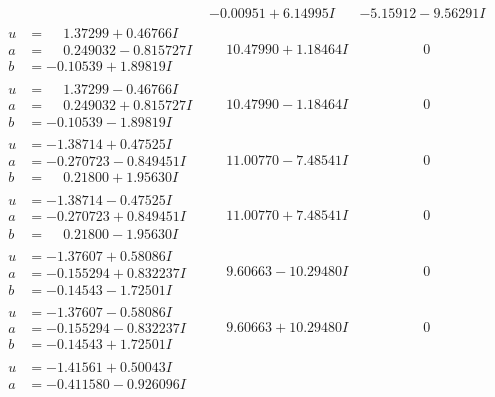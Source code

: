\documentclass[1p]{elsarticle_modified}
\theoremstyle{definition}
\begin{document}
$$\begin{array}{c|c|c}
 & -0.00951 + 6.14995 I & -5.15912 - 9.56291 I \\ \hline\begin{aligned}
u &= \phantom{-}1.37299 + 0.46766 I \\
a &= \phantom{-}0.249032 - 0.815727 I \\
b &= -0.10539 + 1.89819 I\end{aligned}
 & \phantom{-}10.47990 + 1.18464 I & \phantom{-0.000000 } 0 \\ \hline\begin{aligned}
u &= \phantom{-}1.37299 - 0.46766 I \\
a &= \phantom{-}0.249032 + 0.815727 I \\
b &= -0.10539 - 1.89819 I\end{aligned}
 & \phantom{-}10.47990 - 1.18464 I & \phantom{-0.000000 } 0 \\ \hline\begin{aligned}
u &= -1.38714 + 0.47525 I \\
a &= -0.270723 - 0.849451 I \\
b &= \phantom{-}0.21800 + 1.95630 I\end{aligned}
 & \phantom{-}11.00770 - 7.48541 I & \phantom{-0.000000 } 0 \\ \hline\begin{aligned}
u &= -1.38714 - 0.47525 I \\
a &= -0.270723 + 0.849451 I \\
b &= \phantom{-}0.21800 - 1.95630 I\end{aligned}
 & \phantom{-}11.00770 + 7.48541 I & \phantom{-0.000000 } 0 \\ \hline\begin{aligned}
u &= -1.37607 + 0.58086 I \\
a &= -0.155294 + 0.832237 I \\
b &= -0.14543 - 1.72501 I\end{aligned}
 & \phantom{-}9.60663 - 10.29480 I & \phantom{-0.000000 } 0 \\ \hline\begin{aligned}
u &= -1.37607 - 0.58086 I \\
a &= -0.155294 - 0.832237 I \\
b &= -0.14543 + 1.72501 I\end{aligned}
 & \phantom{-}9.60663 + 10.29480 I & \phantom{-0.000000 } 0 \\ \hline\begin{aligned}
u &= -1.41561 + 0.50043 I \\
a &= -0.411580 - 0.926096 I \\

\end{aligned}
\end{array}$$
\end{document}
